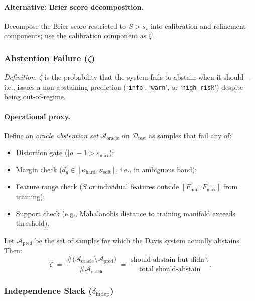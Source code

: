 \documentclass[11pt]{article}
\theoremstyle{remark}
\theoremstyle{plain}
\begin{document}
\paragraph{Alternative: Brier score decomposition.}
Decompose the Brier score restricted to $S > s_\star$ into calibration and refinement components; use the calibration component as $\hat\xi$.

\subsubsection{Abstention Failure ($\zeta$)}
\label{subsubsec:zeta}

\emph{Definition.} $\zeta$ is the probability that the system fails to abstain when it should—i.e., issues a non-abstaining prediction (`\texttt{info}', `\texttt{warn}', or `\texttt{high\_risk}') despite being out-of-regime.

\paragraph{Operational proxy.}
Define an \emph{oracle abstention set} $\mathcal{A}_{\text{oracle}}$ on $\mathcal{D}_{\mathrm{test}}$ as samples that fail any of:
\begin{itemize}[leftmargin=*]
  \item Distortion gate ($|\rho| - 1 > \varepsilon_{\text{max}}$);
  \item Margin check ($d_g \in [\kappa_{\mathrm{hard}}, \kappa_{\mathrm{soft}}]$, i.e., in ambiguous band);
  \item Feature range check ($S$ or individual features outside $[F_{\min}, F_{\max}]$ from training);
  \item Support check (e.g., Mahalanobis distance to training manifold exceeds threshold).
\end{itemize}

Let $\mathcal{A}_{\text{pred}}$ be the set of samples for which the Davis system actually abstains. Then:
\[
\hat\zeta
\;=\;
\frac{\#\bigl(\mathcal{A}_{\text{oracle}} \setminus \mathcal{A}_{\text{pred}}\bigr)}{\#\mathcal{A}_{\text{oracle}}}
\;=\;
\frac{\text{should-abstain but didn't}}{\text{total should-abstain}}.
\]

\subsubsection{Independence Slack ($\delta_{\mathrm{indep}}$)}
\label{subsubsec:deltaindep}
\end{document}
